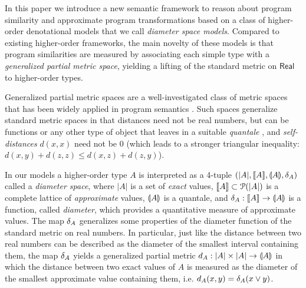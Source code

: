 In this paper we introduce a new semantic framework to reason about program similarity and approximate program transformations based on 
a class of higher-order denotational models that we call \emph{diameter space models}. Compared to existing higher-order frameworks, the main novelty of these models is that program similarities are measured by associating each simple type with 
 a \emph{generalized partial metric space}, yielding a lifting of the standard metric on $\mathsf{Real}$ to higher-order types.

Generalized partial metric spaces are a well-investigated class of metric spaces that has been widely applied in program semantics \cite{bkmp:partial-metrics, Bukatin1997, doi:10.1111/j.1749-6632.1994.tb44144.x, Schellekens2004, Samet:2013aa, Stubbe2018, HE201999}. 
Such spaces generalize standard metric spaces in that distances
need not be real numbers, but can be functions or any other type of object that leaves in a suitable \emph{quantale} \cite{Hofmann2014}, and \emph{self-distances} $d(x,x)$ need not be $0$ (which leads to a stronger triangular inequality: $d(x,y) + d(z,z)\leq d(x,z)+d(z,y)$).



%
%
%


In our models a higher-order type $A$ is interpreted as a 4-tuple $(|A|, \llbracket A \rrbracket, \llparenthesis A \rrparenthesis, \delta_{A})$ called a \emph{diameter space}, where $|A|$ is a set of \emph{exact} values, $\llbracket A \rrbracket\subset \mathcal P(|A|)$ is a complete lattice of \emph{approximate} values, $\llparenthesis A \rrparenthesis$ is a {quantale}, and $\delta_{A}: \llbracket A \rrbracket\to \llparenthesis A \rrparenthesis$ is a function, called \emph{diameter}, which provides a quantitative measure of approximate values.
The map $\delta_{A}$ generalizes some properties of the diameter function of the standard metric on real numbers. In particular, just like the distance between two real numbers can be described as the diameter of the smallest interval containing them, the map $\delta_{A}$ yields a generalized partial metric  $d_{A}:|A|\times |A|\to \llparenthesis A \rrparenthesis$ in which the distance between two exact values of $A$ is measured as the diameter of the smallest approximate value containing them, i.e.  $d_{A}(x,y)=\delta_{A}(x\vee y)$. 



